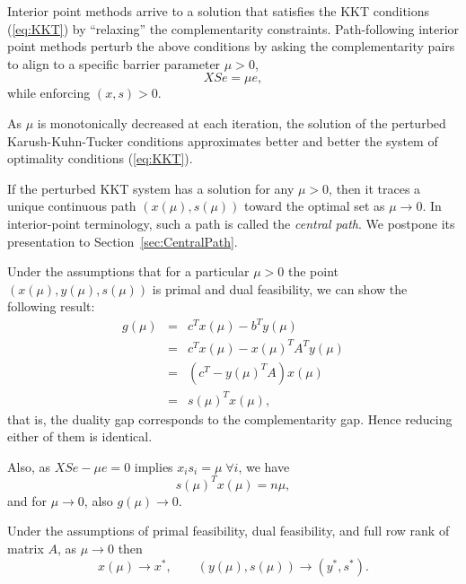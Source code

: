 
Interior point methods arrive to a solution that satisfies the KKT
conditions (\ref{eq:KKT}) by ``relaxing'' the complementarity constraints.
%
Path-following interior point methods \cite{ipm:Wright97} perturb 
the above conditions by asking the complementarity pairs to align 
to a specific barrier parameter $\mu > 0$,
\[
XSe = \mu e,
\]
while enforcing $(x,s)>0$.


As $\mu$ is monotonically decreased at each iteration, the solution of the 
perturbed Karush-Kuhn-Tucker conditions approximates better and better
the system of optimality conditions (\ref{eq:KKT}).

If the perturbed KKT system has a solution for any $\mu > 0$, then
it traces a unique continuous path $(x(\mu),s(\mu))$ toward the 
optimal set as $\mu \to 0$. 
In interior-point terminology, such a path is called
the {\em central path}.
We postpone its presentation to Section~\ref{sec:CentralPath}.

Under the assumptions that for a particular $\mu > 0$ the point
$(x(\mu),y(\mu),s(\mu))$ is primal and dual feasibility, we can show
the following result:
\begin{eqnarray*}
  g(\mu) & = & c^Tx(\mu) - b^T y(\mu) \\
         & = & c^Tx(\mu) - x(\mu)^T A^T y(\mu) \\
         & = & ( c^T - y(\mu)^T A) x(\mu) \\
	 & = & s(\mu)^T x(\mu),
\end{eqnarray*}
that is, the duality gap corresponds to the complementarity gap.
Hence reducing either of them is identical.

Also, as $XSe - \mu e = 0$ implies $x_is_i = \mu \; \forall i$, we have
\[
   s(\mu)^T x(\mu) = n\mu,
\]
and for $\mu \to 0$, also $g(\mu) \to 0$.

\begin{lemma}
Under the assumptions of primal feasibility, dual feasibility, and
full row rank of matrix $A$, as $\mu \to 0$ then 
\[
   x(\mu) \to x^*, \qquad (y(\mu),s(\mu)) \to (y^*, s^*).
\]
\end{lemma}

